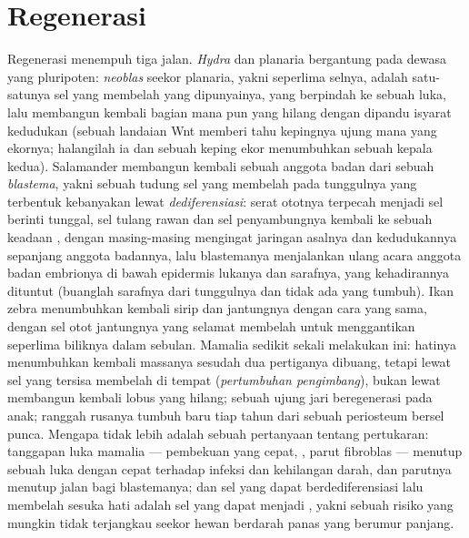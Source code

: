 \section{Regenerasi}

\begin{definition}\label{def:b3:stem-cells:regeneration}
%
Regenerasi menempuh tiga jalan. \emph{Hydra} dan planaria bergantung pada
 dewasa yang pluripoten: \emph{neoblas} seekor planaria, yakni seperlima
selnya, adalah satu-satunya sel yang membelah yang dipunyainya, yang berpindah ke sebuah luka,
lalu membangun kembali bagian mana pun yang hilang dengan dipandu isyarat kedudukan (sebuah landaian
Wnt memberi tahu kepingnya ujung mana yang ekornya; halangilah ia dan sebuah keping ekor
menumbuhkan sebuah kepala kedua). Salamander membangun kembali sebuah anggota badan dari sebuah
\emph{blastema}, yakni sebuah tudung sel yang membelah pada tunggulnya yang terbentuk kebanyakan lewat
\emph{dediferensiasi}: serat ototnya terpecah menjadi sel berinti
tunggal, sel tulang rawan dan sel penyambungnya kembali ke sebuah keadaan ,
dengan masing-masing mengingat jaringan asalnya dan kedudukannya sepanjang anggota badannya,
lalu blastemanya menjalankan ulang acara anggota badan embrionya di bawah epidermis
lukanya dan sarafnya, yang kehadirannya dituntut (buanglah sarafnya dari
tunggulnya dan tidak ada yang tumbuh). Ikan zebra menumbuhkan kembali sirip dan jantungnya dengan cara
yang sama, dengan sel otot jantungnya yang selamat membelah untuk menggantikan seperlima
biliknya dalam sebulan. Mamalia sedikit sekali melakukan ini: hatinya menumbuhkan kembali
massanya sesudah dua pertiganya dibuang, tetapi lewat sel yang tersisa
membelah di tempat (\emph{pertumbuhan pengimbang}), bukan lewat membangun kembali
lobus yang hilang; sebuah ujung jari beregenerasi pada anak; ranggah rusanya
tumbuh baru tiap tahun dari sebuah periosteum bersel punca. Mengapa tidak lebih adalah sebuah
pertanyaan tentang pertukaran: tanggapan luka mamalia --- pembekuan yang cepat,
, parut fibroblas --- menutup sebuah luka dengan cepat terhadap infeksi
dan kehilangan darah, dan parutnya menutup jalan bagi blastemanya; dan sel yang
dapat berdediferensiasi lalu membelah sesuka hati adalah sel yang dapat menjadi
, yakni sebuah risiko yang mungkin tidak terjangkau seekor hewan berdarah panas yang berumur panjang.
\end{definition}

